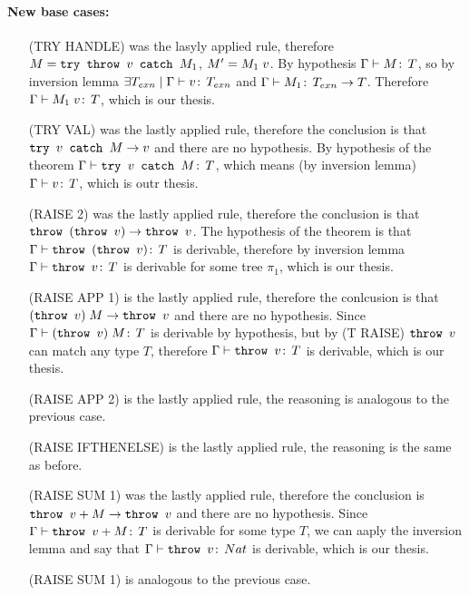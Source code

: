 \paragraph*{New base cases:\\}
\begin{itemize}
\item[(TRY HANDLE)] was the lasyly applied rule, therefore \(M =
  \texttt{try }\texttt{throw }v\texttt{ catch }M_1\), \(M' = M_1\;v\). By hypothesis
  \(\Gamma \vdash M \!:\,T\), so by inversion lemma \(\exists
  T_{exn} \mid \Gamma \vdash v \!:\,T_{exn}\) and \(\Gamma \vdash
  M_1 \!:\,T_{exn} \to T\). Therefore \(\Gamma \vdash M_1\;v
  \!:\,T\), which is our thesis.
\item[(TRY VAL)] was the lastly applied rule, therefore the conclusion
  is that \(\texttt{try }v\texttt{ catch }M \to v\) and there are no hypothesis. By
  hypothesis of the theorem \(\Gamma\vdash \texttt{try }v\texttt{ catch }M\!:\,T\), which
  means (by inversion lemma) \(\Gamma\vdash v \!:\,T\), which is
  outr thesis.
\item[(RAISE 2)] was the lastly applied rule, therefore the conclusion
  is that \(\texttt{throw }(\texttt{throw }v) \to \texttt{throw }v\). The hypothesis of the
  theorem is that \(\Gamma\vdash \texttt{throw }(\texttt{throw }v) \!:\,T\) is
  derivable, therefore by inversion lemma \(\Gamma\vdash \texttt{throw }v
  \!:\,T\) is derivable for some tree \(\pi_1\), which is our
  thesis.
\item[(RAISE APP 1)] is the lastly applied rule, therefore the
  conlcusion is that \((\texttt{throw }v)\;M \to \texttt{throw }v\) and there
  are no hypothesis. Since \(\Gamma\vdash (\texttt{throw }v)\;M
  \!:\,T\) is derivable by hypothesis, but by (T RAISE)
  \(\texttt{throw }v\) can match any type \(T\), therefore \(\Gamma \vdash
  \texttt{throw }v \!:\,T\) is derivable, which is our thesis.
\item[(RAISE APP 2)] is the lastly applied rule, the reasoning is
  analogous to the previous case.
\item[(RAISE IFTHENELSE)] is the lastly applied rule, the reasoning is
  the same as before.
\item[(RAISE SUM 1)] was the lastly applied rule, therefore the
  conclusion is \(\texttt{throw }v + M \to \texttt{throw }v\) and there are no
  hypothesis. Since \(\Gamma \vdash \texttt{throw }v + M \!:\,T\) is
  derivable for some type \(T\), we can aaply the inversion lemma and
  say that \(\Gamma \vdash \texttt{throw }v\!:\,Nat\) is derivable, which
  is our thesis.
\item[(RAISE SUM 1)] is analogous to the previous case.
\end{itemize}

